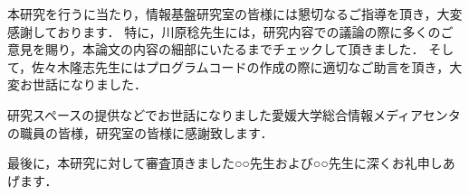 \documentclass{thesis}
\begin{document}


\tableofcontents











\acknowledgement

本研究を行うに当たり，情報基盤研究室の皆様には懇切なるご指導を頂き，大変感謝しております．
特に，川原稔先生には，研究内容での議論の際に多くのご意見を賜り，本論文の内容の細部にいたるまでチェックして頂きました．
そして，佐々木隆志先生にはプログラムコードの作成の際に適切なご助言を頂き，大変お世話になりました．

研究スペースの提供などでお世話になりました愛媛大学総合情報メディアセンタの職員の皆様，研究室の皆様に感謝致します．

最後に，本研究に対して審査頂きました○○先生および○○先生に深くお礼申しあげます．

　


\nocite{*}
\end{document}
